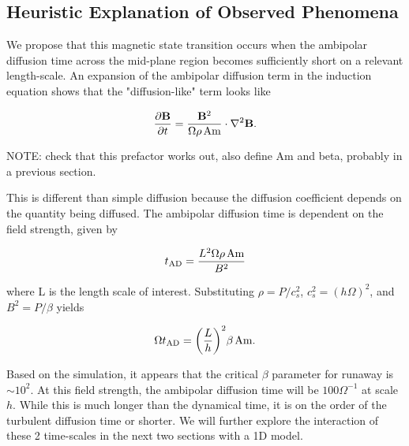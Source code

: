 \newpage
\subsection{Heuristic Explanation of Observed Phenomena}
We propose that this magnetic state transition occurs when the ambipolar diffusion time across the mid-plane region becomes sufficiently short on a relevant length-scale.  An expansion of the ambipolar diffusion term in the induction equation shows that the "diffusion-like" term looks like

\begin{equation}
\frac{\partial \bold{B}}{\partial t} = \frac{\bold{B}^2}{\Omega \rho \hspace{0.5mm} \text{Am}} \cdot \nabla^2 \bold{B}.
\end{equation}

\noindent NOTE: check that this prefactor works out, also define Am and beta, probably in a previous section.

\noindent This is different than simple diffusion because the diffusion coefficient depends on the quantity being diffused.  The ambipolar diffusion time is dependent on the field strength, given by 

\begin{equation}
t_\text{AD} = \frac{L^2 \Omega \rho \hspace{0.5mm} \text{Am}}{B^2}
\end{equation}

\noindent where L is the length scale of interest. Substituting $\rho=P/c_s^2$, $c_s^2=(h\Omega)^2$, and $B^2=P/\beta$ yields

\begin{equation}
\Omega t_\text{AD} = \bigg(\frac{L}{h}\bigg)^2 \beta \hspace{0.5mm} \text{Am}.
\end{equation}

\noindent Based on the simulation, it appears that the critical $\beta$ parameter for runaway is $\sim 10^2$.  At this field strength, the ambipolar diffusion time will be $100\Omega^{-1}$ at scale $h$.  While this is much longer than the dynamical time, it is on the order of the turbulent diffusion time or shorter.  We will further explore the interaction of these 2 time-scales in the next two sections with a 1D model.   


